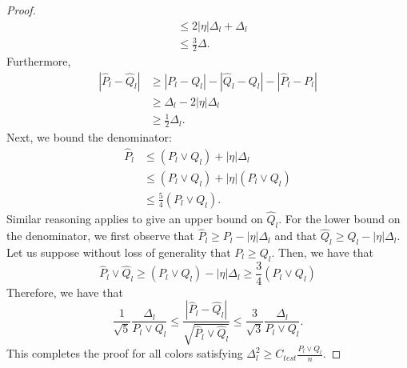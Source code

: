 \documentclass{article}
\begin{document}
\begin{proof}
\begin{align*}
   &\leq 2 |\eta| \Delta_l + \Delta_l \\
   &\leq \frac{3}{2} \Delta.
\end{align*}
Furthermore,
\begin{align*}
| \hat{P}_l - \hat{Q}_l | &\geq  |P_l - Q_l| - |\hat{Q}_l - Q_l| - |\hat{P}_l - P_l|   \\
   &\geq  \Delta_l - 2 |\eta| \Delta_l \\
  &\geq \frac{1}{2} \Delta_l.
\end{align*}
Next, we bound the denominator:
\begin{align*}
\hat{P}_l &\leq (P_l \vee Q_l) + |\eta| \Delta_l\\
   &\leq (P_l \vee Q_l) + |\eta| (P_l \vee Q_l) \\
   &\leq \frac{5}{4} (P_l \vee Q_l).
\end{align*}
Similar reasoning applies to give an upper bound on $\hat{Q}_l$. For the lower bound on the denominator, we first observe that $\hat{P}_l \geq P_l - |\eta| \Delta_l $ and that 
$\hat{Q}_l \geq Q_l - |\eta| \Delta_l$. Let us suppose without loss of generality that $P_l \geq Q_l$. Then, we have that 
\[
\hat{P}_l \vee \hat{Q}_l \geq (P_l \vee Q_l) - |\eta| \Delta_l \geq \frac{3}{4} (P_l \vee Q_l)
\]
Therefore, we have that
\[
\frac{1}{\sqrt{5}} \frac{\Delta_l}{P_l \vee Q_l} \leq \frac{ | \hat{P}_l - \hat{Q}_l | }{\sqrt{ \hat{P}_l \vee \hat{Q}_l}} \leq \frac{3}{\sqrt{3}} \frac{\Delta_l}{P_l \vee Q_l}.
\]
This completes the proof for all colors satisfying $\Delta_l^2 \geq C_{test} \frac{P_l \vee Q_l}{n}$. 


\end{proof}
\end{document}
